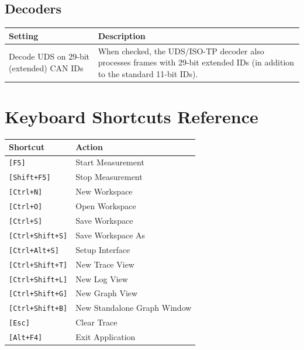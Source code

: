 \documentclass[a4paper,11pt]{article}
\newcommand{\key}[1]{\texttt{\small[#1]}}
\begin{document}
\subsection*{Decoders}

\begin{table}[h]
  \centering
  \begin{tabularx}{\textwidth}{lX}
    \toprule
    \textbf{Setting} & \textbf{Description} \\
    \midrule
    Decode UDS on 29-bit (extended) CAN IDs
      & When checked, the UDS/ISO-TP decoder also processes frames with
        29-bit extended IDs (in addition to the standard 11-bit IDs). \\
    \bottomrule
  \end{tabularx}
\end{table}

\section{Keyboard Shortcuts Reference}

\begin{longtable}{p{4.5cm} p{8.5cm}}
  \toprule
  \textbf{Shortcut} & \textbf{Action} \\
  \midrule
  \endhead
  \key{F5}               & Start Measurement \\
  \key{Shift+F5}         & Stop Measurement \\
  \key{Ctrl+N}           & New Workspace \\
  \key{Ctrl+O}           & Open Workspace \\
  \key{Ctrl+S}           & Save Workspace \\
  \key{Ctrl+Shift+S}     & Save Workspace As \\
  \key{Ctrl+Alt+S}       & Setup Interface \\
  \key{Ctrl+Shift+T}     & New Trace View \\
  \key{Ctrl+Shift+L}     & New Log View \\
  \key{Ctrl+Shift+G}     & New Graph View \\
  \key{Ctrl+Shift+B}     & New Standalone Graph Window \\
  \key{Esc}              & Clear Trace \\
  \key{Alt+F4}           & Exit Application \\
  \bottomrule
\end{longtable}
\end{document}
